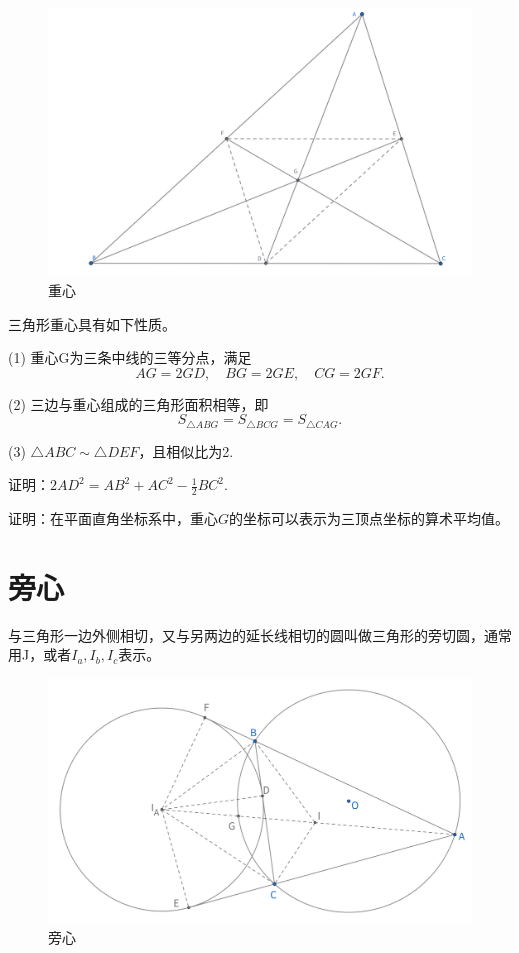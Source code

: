 \begin{figure}[H]
    \centering
    \includegraphics[width=0.8\linewidth]{figures/重心.png}
    \caption{重心}
\end{figure}

\begin{proposition}[重心性质]
    三角形重心具有如下性质。
    
    (1) 重心G为三条中线的三等分点，满足
    $$AG=2GD,\quad 
    BG=2GE,\quad
    CG=2GF.$$

    (2) 三边与重心组成的三角形面积相等，即
    $$S_{\triangle ABG} = S_{\triangle BCG}=S_{\triangle CAG}.$$

    (3) $\triangle ABC \sim \triangle DEF$，且相似比为2.
\end{proposition}
\begin{exercise}
    证明：$2AD^2=AB^2+AC^2-\frac{1}{2}BC^2.$
\end{exercise}
\begin{exercise}
    证明：在平面直角坐标系中，重心$G$的坐标可以表示为三顶点坐标的算术平均值。
\end{exercise}


\newpage
\section{旁心}
\begin{definition}[旁心]
    与三角形一边外侧相切，又与另两边的延长线相切的圆叫做三角形的旁切圆，通常用J，或者$I_a,I_b,I_c$表示。    
\end{definition}

\begin{figure}[H]
    \centering
    \includegraphics[width=0.6\linewidth]{figures/三角形五心/旁心.png}
    \caption{旁心}
\end{figure}


